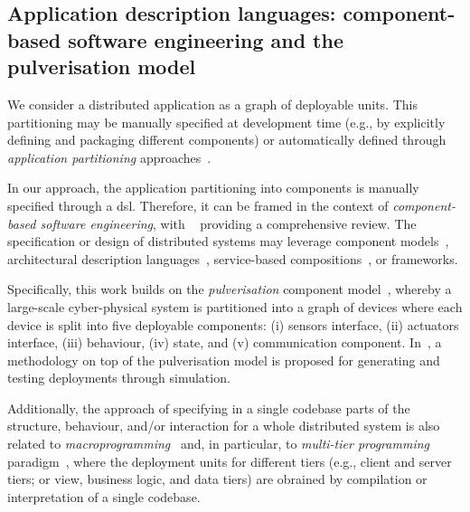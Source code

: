 \documentclass[conference]{IEEEtran}
\begin{document}
\subsection{Application description languages: component-based software engineering and the pulverisation model}
\label{sec:rw:whatsw}
%
%
We consider a distributed application 
 as a graph of deployable units.
%
This partitioning may be 
 manually specified at development time
 (e.g., by explicitly defining and packaging different components)
 or automatically defined
 through \emph{application partitioning} approaches~\cite{DBLP:journals/jnca/LiuASGBQ15}. %
 
In our approach, the application partitioning into components is manually specified through a \ac{dsl}.
%
Therefore, it can be framed in the context of \emph{component-based software engineering},
 with ~\cite{vale2016component-based-se} providing a comprehensive review.
%
The specification or design of distributed systems
 may leverage
 component models~\cite{DBLP:journals/tse/CrnkovicSVC11},
 architectural description languages~\cite{DBLP:journals/tse/MedvidovicT00},
 service-based compositions~\cite{DBLP:journals/csur/LemosDB16}, 
 or frameworks.
%

Specifically,
 this work builds on the \emph{pulverisation} component model~\cite{FI2020-pulverization,IEEE-IoTJ-pulverization-simulation},
 whereby a large-scale cyber-physical system
 is partitioned into a graph of devices
 where each device is split into five deployable components:
 (i) sensors interface, 
 (ii) actuators interface, 
 (iii) behaviour, 
 (iv) state, and 
 (v) communication component.
%
In~\cite{IEEE-IoTJ-pulverization-simulation},
 a methodology on top of the pulverisation model
 is proposed
 for generating and testing deployments through simulation.

Additionally,
 the approach of specifying in a single codebase 
 parts of the structure, behaviour, and/or interaction 
 for a whole distributed system
 is also related to \emph{macroprogramming}~\cite{Casadei2023macro}
 and, in particular, to \emph{multi-tier programming} paradigm~\cite{DBLP:journals/csur/WeisenburgerWS20},
 where the deployment units for different tiers (e.g., client and server tiers; or view, business logic, and data tiers) are obrained by compilation or interpretation of a single codebase.
\end{document}
